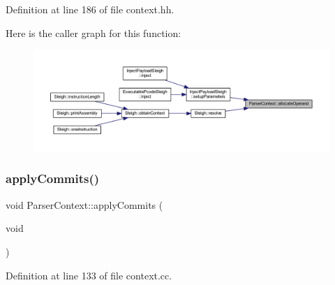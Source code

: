 Definition at line 186 of file context.\+hh.

Here is the caller graph for this function\+:
\nopagebreak
\begin{figure}[H]
\begin{center}
\leavevmode
\includegraphics[width=350pt]{class_parser_context_a93151174575222516e445bd6a06cb93c_icgraph}
\end{center}
\end{figure}
\mbox{\label{class_parser_context_aa08843c5d8fb8267069a83120b77bed5}} 
\subsubsection{\texorpdfstring{applyCommits()}{applyCommits()}}
{\footnotesize\ttfamily void Parser\+Context\+::apply\+Commits (\begin{DoxyParamCaption}\item[{void}]{ }\end{DoxyParamCaption})}



Definition at line 133 of file context.\+cc.

